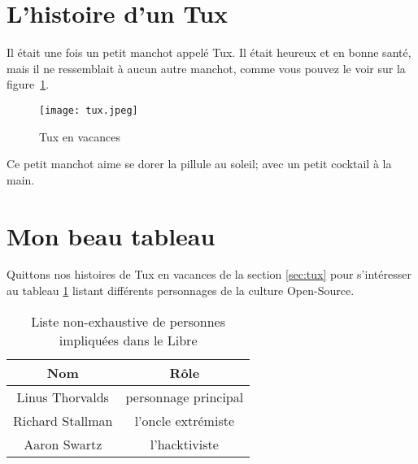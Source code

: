\documentclass[a4paper, 12pt]{article}
\begin{document}
\section{L'histoire d'un Tux \label{sec:tux}}
Il était une fois un petit manchot appelé Tux.  Il était heureux et en bonne santé, mais il ne ressemblait à aucun autre manchot, comme vous pouvez le voir sur la figure~\ref{fig:tux}.
\begin{figure}
\centering
\texttt{[image: tux.jpeg]}
\caption{Tux en vacances}
\label{fig:tux}
\end{figure}
Ce petit manchot aime se dorer la pillule au soleil; avec un petit cocktail à la main.

\section{Mon beau tableau}
Quittons nos histoires de Tux en vacances de la section \ref{sec:tux} pour s'intéresser au tableau \ref{tab:Linux} listant différents personnages de la culture Open-Source.
\begin{table}
\centering
\begin{tabular}{|c||c|}
\hline
Nom & Rôle \\
\hline
\hline
Linus Thorvalds & personnage principal \\
\hline
Richard Stallman & l'oncle extrémiste \\
\hline
Aaron Swartz & l'hacktiviste \\
\hline
\end{tabular}
\caption{Liste non-exhaustive de personnes impliquées dans le Libre}
\label{tab:Linux}
\end{table}
\end{document}

